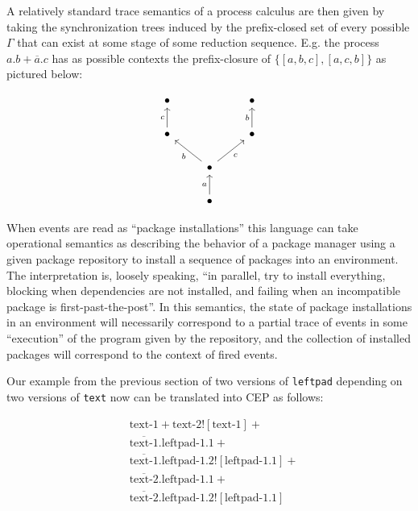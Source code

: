 \documentclass[hoptionsi,review,screen,format=sigconf]{acmart}
\theoremstyle{definition}
\begin{document}
A relatively standard trace semantics \cite{bloom1995bisimulation, winskel1984synchronization} of a process calculus are then given by taking the synchronization trees induced by the prefix-closed set of every possible \(\Gamma\) that can exist at some stage of some reduction sequence. E.g. the process \(a.b + \overline{a}.c\) has as possible contexts the prefix-closure of \(\{[a,b,c],[a,c,b]\}\) as pictured below:

\begin{equation*}
\begin{tikzcd}
\bullet                &                                                & \bullet                \\
\bullet \arrow[u, "c"] &                                                & \bullet \arrow[u, "b"] \\
                             & \bullet \arrow[lu, "b"] \arrow[ru, "c"'] &                              \\
                             & \bullet \arrow[u, "a"]                   &                             
\end{tikzcd}
\end{equation*}

When events are read as ``package installations'' this language can take operational semantics as describing the behavior of a package manager using a given package repository to install a sequence of packages into an environment. The interpretation is, loosely speaking, ``in parallel, try to install everything, blocking when dependencies are not installed, and failing when an incompatible package is first-past-the-post''. In this semantics, the state of package installations in an environment will necessarily correspond to a partial trace of events in some ``execution'' of the program given by the repository, and the collection of installed packages will correspond to the context of fired events.

Our example from the previous section of two versions of \texttt{leftpad} depending on two versions of \texttt{text} now can be translated into CEP as follows:

\begin{align*}
& \mathrm{text\text{-}1} + \mathrm{text\text{-}2}![\mathrm{text\text{-}1}] + 
\\ 
& \overline{\mathrm{text\text{-}1}}.\mathrm{leftpad\text{-}1.1} + 
\\ 
& \overline{\mathrm{text\text{-}1}}.\mathrm{leftpad\text{-}1.2}![\mathrm{leftpad\text{-}1.1}] + 
 \\
& \overline{\mathrm{text\text{-}2}}.\mathrm{leftpad\text{-}1.1} + 
\\ 
& \overline{\mathrm{text\text{-}2}}.\mathrm{leftpad\text{-}1.2}![\mathrm{leftpad\text{-}1.1}] 
\end{align*}
\end{document}
